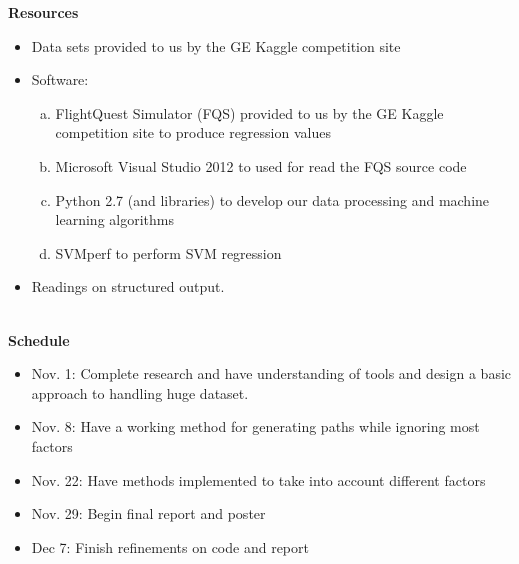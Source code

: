 \documentclass{article}[9pt]
\begin{document}
\noindent
\Large{\textbf{Resources}}
\begin{itemize}
	\item Data sets provided to us by the GE Kaggle competition site
	\item Software: 
		\begin{enumerate}[(a)]
			\item FlightQuest Simulator (FQS) provided to us by the GE Kaggle competition site to produce regression values
			\item Microsoft Visual Studio 2012 to used for read the FQS source code
			\item Python 2.7 (and libraries) to develop our data processing and machine learning algorithms
			\item SVMperf to perform SVM regression
		\end{enumerate}
	\item Readings on structured output. 
\end{itemize}
\hspace*{\fill}\\
\Large{\textbf{Schedule}}
\noindent
\begin{itemize}
	\item Nov. 1: Complete research and have understanding of tools and design a basic approach to handling huge dataset.
	\item Nov. 8: Have a working method for generating paths while ignoring most factors
	\item Nov. 22: Have methods implemented to take into account different factors
	\item Nov. 29: Begin final report and poster
	\item Dec 7: Finish refinements on code and report 
\end{itemize}
\end{document}
